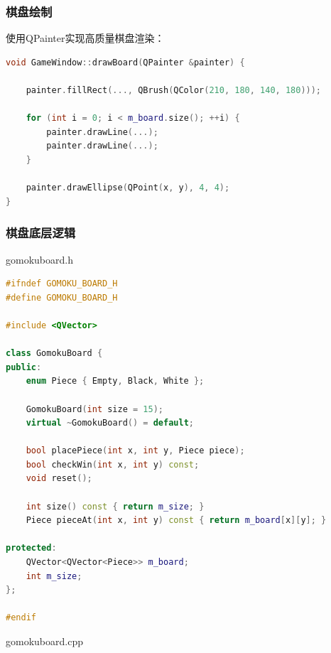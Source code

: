 \documentclass[UTF8]{ctexart}
\begin{document}
\subsubsection{棋盘绘制}
使用QPainter实现高质量棋盘渲染：
\begin{lstlisting}[language=C++]
void GameWindow::drawBoard(QPainter &painter) {

    painter.fillRect(..., QBrush(QColor(210, 180, 140, 180)));

    for (int i = 0; i < m_board.size(); ++i) {
        painter.drawLine(...);
        painter.drawLine(...);
    }

    painter.drawEllipse(QPoint(x, y), 4, 4);
}
\end{lstlisting}
\subsubsection{棋盘底层逻辑}
gomokuboard.h
\begin{lstlisting}[language=C++]
#ifndef GOMOKU_BOARD_H
#define GOMOKU_BOARD_H

#include <QVector>

class GomokuBoard {
public:
    enum Piece { Empty, Black, White };

    GomokuBoard(int size = 15);
    virtual ~GomokuBoard() = default;

    bool placePiece(int x, int y, Piece piece);
    bool checkWin(int x, int y) const;
    void reset();

    int size() const { return m_size; }
    Piece pieceAt(int x, int y) const { return m_board[x][y]; }

protected:
    QVector<QVector<Piece>> m_board;
    int m_size;
};

#endif
\end{lstlisting}
gomokuboard.cpp
\end{document}
